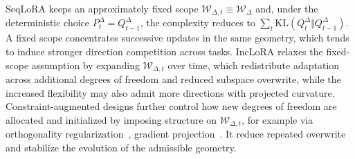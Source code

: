 \documentclass{article}
\theoremstyle{plain}
\theoremstyle{definition}
\theoremstyle{remark}
\begin{document}
SeqLoRA keeps an approximately fixed scope $\mathcal W_{\Delta,t}\equiv\mathcal W_\Delta$ and, under the deterministic choice $P_t^\Delta=Q_{t-1}^\Delta$, the complexity reduces to $\sum_t\mathrm{KL}(Q_t^\Delta\Vert Q_{t-1}^\Delta)$.
A fixed scope concentrates successive updates in the same geometry, which tends to induce stronger direction competition across tasks.
IncLoRA relaxes the fixed-scope assumption by expanding $\mathcal W_{\Delta,t}$ over time, which redistribute adaptation across additional degrees of freedom and reduced subspace overwrite, while the increased flexibility may also admit more directions with projected curvature.
Constraint-augmented designs further control how new degrees of freedom are allocated and initialized by imposing structure on $\mathcal W_{\Delta,t}$, for example via orthogonality regularization~\cite{wang2023orthogonal}, gradient projection~\citep{Liang_2024_CVPR,yang2024parametercollisionhinderingcontinual}.
It reduce repeated overwrite and stabilize the evolution of the admissible geometry.






 
\end{document}
